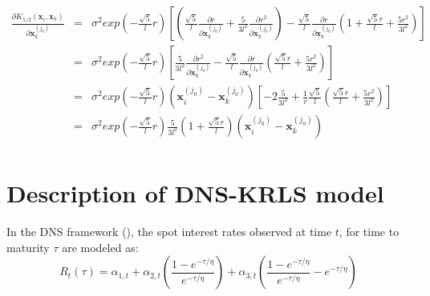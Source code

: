 \begin{itemize}
\begin{eqnarray*}
\frac{\partial K_{5/2}(\textbf{x}_i, \textbf{x}_k)}{\partial \textbf{x}_k^{(j_0)}} &=& \sigma^2 exp\left(-\frac{\sqrt{5}}{l}r\right) \left[ \left( \frac{\sqrt{5}}{l} \frac{\partial r}{\partial \textbf{x}_k^{(j_0)}} + \frac{5}{3 l^2} \frac{\partial r^2}{\partial \textbf{x}_k^{(j_0)}} \right)  - \frac{\sqrt{5}}{l} \frac{\partial r}{\partial \textbf{x}_k^{(j_0)}}\left( 1 + \frac{\sqrt{5}r}{l} + \frac{5 r^2}{3 l^2} \right)\right] \\
&=& \sigma^2 exp\left(-\frac{\sqrt{5}}{l}r\right) \left[ \frac{5}{3 l^2} \frac{\partial r^2}{\partial \textbf{x}_k^{(j_0)}}  - \frac{\sqrt{5}}{l} \frac{\partial r}{\partial \textbf{x}_k^{(j_0)}}\left(\frac{\sqrt{5}r}{l} + \frac{5 r^2}{3 l^2} \right)\right] \\
&=& \sigma^2 exp\left(-\frac{\sqrt{5}}{l}r\right) \left(\textbf{x}_i^{(j_0)} - \textbf{x}_k^{(j_0)} \right) \left[ -2\frac{5}{3 l^2} + \frac{1}{r}\frac{\sqrt{5}}{l} \left(\frac{\sqrt{5}r}{l} + \frac{5 r^2}{3 l^2} \right)\right] \\
&=& \sigma^2 exp\left(-\frac{\sqrt{5}}{l}r\right) \frac{5}{3l^2} \left( 1 + \frac{\sqrt{5} r}{l} \right)\left(\textbf{x}_i^{(j_0)} - \textbf{x}_k^{(j_0)} \right)\\
\end{eqnarray*}

\end{itemize}


\section{Description of DNS-KRLS model}
\label{sec:dnskrls}

In the DNS framework (\cite{diebold2006forecasting}), the spot interest rates observed at time $t$, for time to maturity $\tau$ are modeled as:
\begin{equation}
R_t(\tau) = \alpha_{1, t} + \alpha_{2, t}\left(\frac{1-e^{-\tau/\eta}}{e^{-\tau/\eta}}\right) + \alpha_{3, t}\left(\frac{1-e^{-\tau/\eta}}{e^{-\tau/\eta}} - e^{-\tau/\eta}\right)
\end{equation}

\medskip

